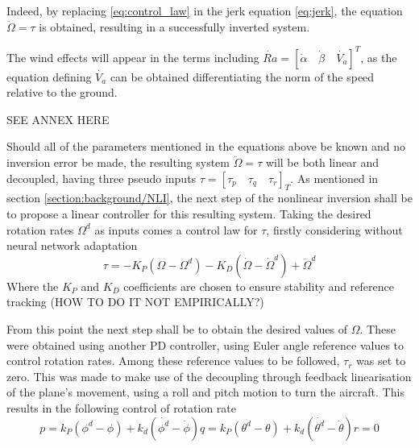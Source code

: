 Indeed, by replacing \ref{eq:control_law} in the jerk equation \ref{eq:jerk}, the equation $\ddot{\Omega} = \tau$ is obtained, resulting in a successfully inverted system.


The wind effects will appear in the terms including $\dot{Ra} =  [\dot{\alpha} \quad \dot{\beta} \quad \dot{V_a}]^T$, as the equation defining $\dot{V_a}$ can be obtained differentiating the norm of the speed relative to the ground. 


SEE ANNEX HERE 

Should all of the parameters mentioned in the equations above be known and no inversion error be made, the resulting system $\ddot{\Omega}=\tau$ will be both linear and decoupled, having three pseudo inputs $\tau = [\tau_p \quad \tau_q \quad \tau_r]_T$. As mentioned in section \ref{section:background/NLI}, the next step of the nonlinear inversion shall be to propose a linear controller for this resulting system. Taking the desired rotation rates $\Omega^d$ as inputs comes a control law for $\tau$, firstly considering without neural network adaptation
\begin{equation}
\tau = -K_P (\Omega-\Omega^d)-K_D (\dot{\Omega}-\dot{\Omega}^d)+\ddot{\Omega}^d
\label{eq:linear_controller}
\end{equation}
Where the $K_P$ and $K_D$ coefficients are chosen to ensure stability and reference tracking 
(HOW TO DO IT NOT EMPIRICALLY?)

From this point the next step shall be to obtain the desired values of $\Omega$. These were obtained using another PD controller, using Euler angle reference values to control rotation rates. Among these reference values to be followed, $\tau_r$ was set to zero. This was made to make use of the decoupling through feedback linearisation of the plane's movement, using a roll and pitch motion to turn the aircraft. This results in the following control of rotation rate
\begin{subequations}
\begin{equation}
p= k_P (\phi^d-\phi) + k_d (\dot{\phi^d}-\dot{\phi})
\end{equation}
\begin{equation}
q= k_P (\theta^d-\theta) + k_d (\dot{\theta^d}-\dot{\theta})
\end{equation}
\begin{equation}
r=0
\end{equation}
\end{subequations}

